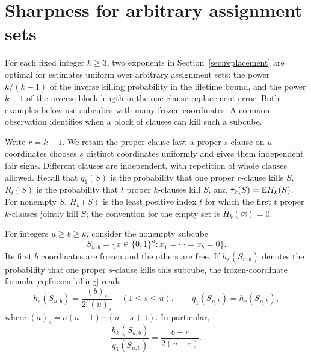 \section{Sharpness for arbitrary assignment sets}
\label{sec:replacement-sharpness}

For each fixed integer \(k\ge3\), two exponents in
Section~\ref{sec:replacement} are optimal for estimates uniform over
arbitrary assignment sets: the power \(k/(k-1)\) of the inverse killing
probability in the lifetime bound, and the power \(k-1\) of the inverse
block length in the one-clause replacement error.  Both examples below
use subcubes with many frozen coordinates.  A common observation
identifies when a block of clauses can kill such a subcube.

Write \(r=k-1\).  We retain the proper clause law:
a proper \(s\)-clause on \(u\) coordinates chooses \(s\) distinct
coordinates uniformly and gives them independent fair signs.  Different
clauses are independent, with repetition of whole clauses allowed.
Recall that \(q_1(S)\) is the probability that one proper \(r\)-clause
kills \(S\), \(R_t(S)\) is the probability that \(t\) proper \(k\)-clauses
kill \(S\), and \(\tau_k(S)=\mathbb E H_k(S)\).  For nonempty \(S\),
\(H_k(S)\) is the least positive index \(t\) for which the first \(t\)
proper \(k\)-clauses jointly kill \(S\); the convention for the empty set
is \(H_k(\varnothing)=0\).

For integers \(u\ge b\ge k\), consider the nonempty subcube
\[
 S_{u,b}=\{x\in\{0,1\}^u:x_1=\cdots=x_b=0\}.
\]
Its first \(b\) coordinates are frozen and the others are free.  If
\(h_s(S_{u,b})\) denotes the probability that one proper \(s\)-clause
kills this subcube, the frozen-coordinate formula
\eqref{eq:frozen-killing} reads
\begin{equation}\label{eq:sharp-subcube-probabilities}
 h_s(S_{u,b})=\frac{(b)_s}{2^s(u)_s}\quad(1\le s\le u),
 \qquad q_1(S_{u,b})=h_r(S_{u,b}),
\end{equation}
where \((a)_s=a(a-1)\cdots(a-s+1)\).  In particular,
\begin{equation}\label{eq:sharp-successive-ratio}
 \frac{h_k(S_{u,b})}{q_1(S_{u,b})}
 =\frac{b-r}{2(u-r)}.
\end{equation}

